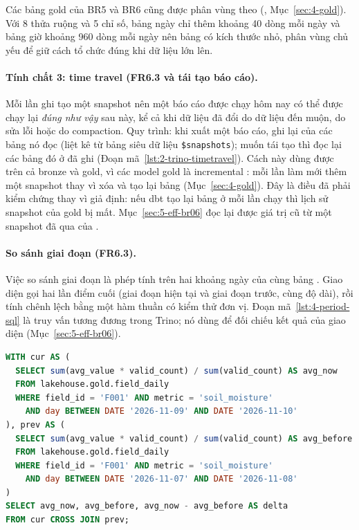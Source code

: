 Các bảng gold của BR5 và BR6 cũng được phân vùng theo  (, Mục~\ref{sec:4-gold}). Với 8 thửa ruộng và 5 chỉ số, bảng ngày chỉ thêm khoảng 40 dòng mỗi ngày và bảng giờ khoảng 960 dòng mỗi ngày nên bảng có kích thước nhỏ, phân vùng chủ yếu để giữ cách tổ chức đúng khi dữ liệu lớn lên.

\paragraph{Tính chất 3: time travel (FR6.3 và tái tạo báo cáo).} Mỗi lần ghi tạo một snapshot nên một báo cáo được chạy hôm nay có thể được chạy lại \emph{đúng như vậy} sau này, kể cả khi dữ liệu đã đổi do dữ liệu đến muộn, do sửa lỗi hoặc do compaction. Quy trình: khi xuất một báo cáo, ghi lại  của các bảng nó đọc (liệt kê từ bảng siêu dữ liệu \texttt{\$snapshots}); muốn tái tạo thì đọc lại các bảng đó ở  đã ghi (Đoạn mã~\ref{lst:2-trino-timetravel}). Cách này dùng được trên cả bronze và gold, vì các model gold là incremental : mỗi lần làm mới thêm một snapshot thay vì xóa và tạo lại bảng (Mục~\ref{sec:4-gold}). Đây là điều đã phải kiểm chứng thay vì giả định: nếu dbt tạo lại bảng ở mỗi lần chạy thì lịch sử snapshot của gold bị mất. Mục~\ref{sec:5-eff-br06} đọc lại được giá trị cũ từ một snapshot đã qua của .

\paragraph{So sánh giai đoạn (FR6.3).} Việc so sánh giai đoạn là phép tính trên hai khoảng ngày của cùng bảng . Giao diện gọi hai lần điểm cuối  (giai đoạn hiện tại và giai đoạn trước, cùng độ dài), rồi tính chênh lệch bằng một hàm thuần có kiểm thử đơn vị. Đoạn mã~\ref{lst:4-period-sql} là truy vấn tương đương trong Trino; nó dùng để đối chiếu kết quả của giao diện (Mục~\ref{sec:5-eff-br06}).

\begin{lstlisting}[language=SQL, caption={So sánh hai giai đoạn, trung bình có trọng số (Trino, \texttt{field\_daily})}, label={lst:4-period-sql}]
WITH cur AS (
  SELECT sum(avg_value * valid_count) / sum(valid_count) AS avg_now
  FROM lakehouse.gold.field_daily
  WHERE field_id = 'F001' AND metric = 'soil_moisture'
    AND day BETWEEN DATE '2026-11-09' AND DATE '2026-11-10'
), prev AS (
  SELECT sum(avg_value * valid_count) / sum(valid_count) AS avg_before
  FROM lakehouse.gold.field_daily
  WHERE field_id = 'F001' AND metric = 'soil_moisture'
    AND day BETWEEN DATE '2026-11-07' AND DATE '2026-11-08'
)
SELECT avg_now, avg_before, avg_now - avg_before AS delta
FROM cur CROSS JOIN prev;
\end{lstlisting}

